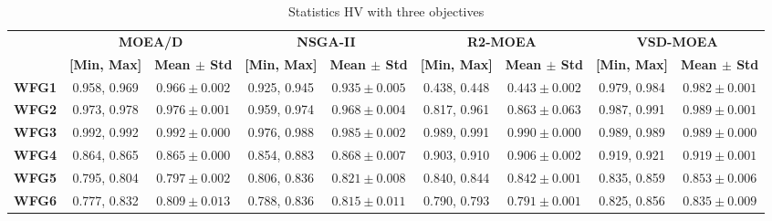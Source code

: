 \begin{table*}[t]
\caption{Statistics HV with three objectives}
\label{tab:StatisticsHV_3obj}
\begin{tabular}{c|c|c|c|c|c|c|c|c|}
\cline{2-9}
\textbf{}                            & \multicolumn{2}{c|}{\textbf{MOEA/D}}              & \multicolumn{2}{c|}{\textbf{NSGA-II}}             & \multicolumn{2}{c|}{\textbf{R2-MOEA}}             & \multicolumn{2}{c|}{\textbf{VSD-MOEA}}            \\ \cline{2-9} 
\textbf{}                            & \textbf{{[}Min, Max{]}} & \textbf{Mean $\pm$ Std} & \textbf{{[}Min, Max{]}} & \textbf{Mean $\pm$ Std} & \textbf{{[}Min, Max{]}} & \textbf{Mean $\pm$ Std} & \textbf{{[}Min, Max{]}} & \textbf{Mean $\pm$ Std} \\ \hline
\multicolumn{1}{|c|}{\textbf{WFG1}}  & 0.958, 0.969            & $0.966 \pm 0.002$       & 0.925, 0.945            & $0.935 \pm 0.005$       & 0.438, 0.448            & $0.443 \pm 0.002$       & 0.979, 0.984            & $0.982 \pm 0.001$       \\ \hline
\multicolumn{1}{|c|}{\textbf{WFG2}}  & 0.973, 0.978            & $0.976 \pm 0.001$       & 0.959, 0.974            & $0.968 \pm 0.004$       & 0.817, 0.961            & $0.863 \pm 0.063$       & 0.987, 0.991            & $0.989 \pm 0.001$       \\ \hline
\multicolumn{1}{|c|}{\textbf{WFG3}}  & 0.992, 0.992            & $0.992 \pm 0.000$       & 0.976, 0.988            & $0.985 \pm 0.002$       & 0.989, 0.991            & $0.990 \pm 0.000$       & 0.989, 0.989            & $0.989 \pm 0.000$       \\ \hline
\multicolumn{1}{|c|}{\textbf{WFG4}}  & 0.864, 0.865            & $0.865 \pm 0.000$       & 0.854, 0.883            & $0.868 \pm 0.007$       & 0.903, 0.910            & $0.906 \pm 0.002$       & 0.919, 0.921            & $0.919 \pm 0.001$       \\ \hline
\multicolumn{1}{|c|}{\textbf{WFG5}}  & 0.795, 0.804            & $0.797 \pm 0.002$       & 0.806, 0.836            & $0.821 \pm 0.008$       & 0.840, 0.844            & $0.842 \pm 0.001$       & 0.835, 0.859            & $0.853 \pm 0.006$       \\ \hline
\multicolumn{1}{|c|}{\textbf{WFG6}}  & 0.777, 0.832            & $0.809 \pm 0.013$       & 0.788, 0.836            & $0.815 \pm 0.011$       & 0.790, 0.793            & $0.791 \pm 0.001$       & 0.825, 0.856            & $0.835 \pm 0.009$       \\ \hline

\end{tabular}
\end{table*}
